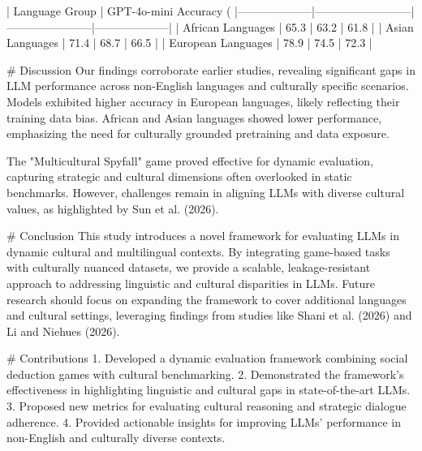 | Language Group     | GPT-4o-mini Accuracy (%
|--------------------|--------------------------|-----------------------|--------------------|  
| African Languages  | 65.3                    | 63.2                 | 61.8              |  
| Asian Languages    | 71.4                    | 68.7                 | 66.5              |  
| European Languages | 78.9                    | 74.5                 | 72.3              |  

# Discussion  
Our findings corroborate earlier studies, revealing significant gaps in LLM performance across non-English languages and culturally specific scenarios. Models exhibited higher accuracy in European languages, likely reflecting their training data bias. African and Asian languages showed lower performance, emphasizing the need for culturally grounded pretraining and data exposure.  

The "Multicultural Spyfall" game proved effective for dynamic evaluation, capturing strategic and cultural dimensions often overlooked in static benchmarks. However, challenges remain in aligning LLMs with diverse cultural values, as highlighted by Sun et al. (2026).

# Conclusion  
This study introduces a novel framework for evaluating LLMs in dynamic cultural and multilingual contexts. By integrating game-based tasks with culturally nuanced datasets, we provide a scalable, leakage-resistant approach to addressing linguistic and cultural disparities in LLMs. Future research should focus on expanding the framework to cover additional languages and cultural settings, leveraging findings from studies like Shani et al. (2026) and Li and Niehues (2026).

# Contributions  
1. Developed a dynamic evaluation framework combining social deduction games with cultural benchmarking.  
2. Demonstrated the framework's effectiveness in highlighting linguistic and cultural gaps in state-of-the-art LLMs.  
3. Proposed new metrics for evaluating cultural reasoning and strategic dialogue adherence.  
4. Provided actionable insights for improving LLMs' performance in non-English and culturally diverse contexts.